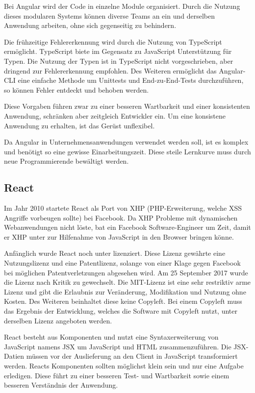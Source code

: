 Bei Angular wird der Code in einzelne Module organisiert. Durch die Nutzung dieses modularen Systems können diverse Teams an ein und derselben Anwendung arbeiten, ohne sich gegenseitig zu behindern.

Die frühzeitige Fehlererkennung wird durch die Nutzung von TypeScript ermöglicht. TypeScript biete im Gegensatz zu JavaScript Unterstützung für Typen. Die Nutzung der Typen ist in TypeScript nicht vorgeschrieben, aber dringend zur Fehlererkennung empfohlen.
Des Weiteren ermöglicht das Angular-CLI eine einfache Methode um Unittests und End-zu-End-Tests durchzuführen, so können Fehler entdeckt und behoben werden. \cite{wahlinWesentlichenVorteileAngular2017}

Diese Vorgaben führen zwar zu einer besseren Wartbarkeit und einer konsistenten Anwendung, schränken aber zeitgleich Entwickler ein. Um eine konsistene Anwendung zu erhalten, ist das Gerüst unflexibel.

Da Angular in Unternehmensanwendungen verwendet werden soll, ist es komplex und benötigt so eine gewisse Einarbeitungszeit. Diese steile Lernkurve muss durch neue Programmierende bewältigt werden. \cite{ventzkemediaAngularVsReact2018}

\subsection{React}
Im Jahr 2010 startete React als Port von XHP (PHP-Erweiterung, welche XSS Angriffe vorbeugen sollte) bei Facebook. Da XHP Probleme mit dynamischen Webanwendungen nicht löste, bat ein Facebook Software-Engineer um Zeit, damit er XHP unter zur Hilfenahme von JavaScript in den Browser bringen könne. \cite{dawsonJavaScriptHistoryHow2014}

Anfänglich wurde React noch unter  lizenziert. Diese Lizenz gewährte eine Nutzungslizenz und eine Patentlizenz, solange von einer Klage gegen Facebook bei möglichen Patentverletzungen abgesehen wird. Am 25 September 2017 wurde die Lizenz nach Kritik zu  gewechselt. \cite{kripalaniIfYouRe2017} \cite{larsonFacebookJustChanged2017} Die MIT-Lizenz ist eine sehr restriktiv arme Lizenz und gibt die Erlaubnis zur Veränderung, Modifikation und Nutzung ohne Kosten. Des Weiteren beinhaltet diese keine Copyleft. Bei einem Copyleft muss das Ergebnis der Entwicklung, welches die Software mit Copyleft nutzt, unter derselben Lizenz angeboten werden. \cite{wehnerSoftwareUnterMIT2020}

React besteht aus Komponenten und nutzt eine Syntaxerweiterung von JavaScript namens JSX um JavaScript und HTML zusammenzuführen. Die JSX-Datien müssen vor der Auslieferung  an den Client in JavaScript transformiert werden. Reacts Komponenten sollten möglichst klein sein und nur eine Aufgabe erledigen. Diese führt zu einer besseren Test- und Wartbarkeit sowie einem besseren Verständnis der Anwendung.

